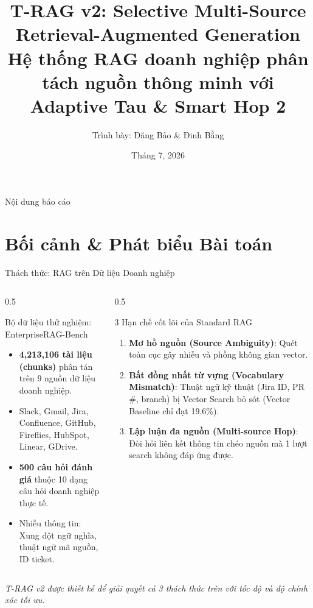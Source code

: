 \documentclass[aspectratio=169,10pt]{beamer}
\title[\textbf{T-RAG v2}]{\textbf{T-RAG v2: Selective Multi-Source Retrieval-Augmented Generation}\\
\large Hệ thống RAG doanh nghiệp phân tách nguồn thông minh với Adaptive Tau \& Smart Hop 2}
\author{Trình bày: Đăng Bảo \& Đinh Bằng}
\date{Tháng 7, 2026}
\institute{}
\begin{document}
\begin{frame}
\titlepage
\end{frame}

\begin{frame}{Nội dung báo cáo}
\tableofcontents
\end{frame}

\section{Bối cảnh \& Phát biểu Bài toán}

\begin{frame}{Thách thức: RAG trên Dữ liệu Doanh nghiệp}
\small
\begin{columns}
\begin{column}{0.5\textwidth}
\begin{block}{Bộ dữ liệu thử nghiệm: EnterpriseRAG-Bench}
\begin{itemize}
    \item \textbf{4,213,106 tài liệu (chunks)} phân tán trên 9 nguồn dữ liệu doanh nghiệp.
    \item Slack, Gmail, Jira, Confluence, GitHub, Fireflies, HubSpot, Linear, GDrive.
    \item \textbf{500 câu hỏi đánh giá} thuộc 10 dạng câu hỏi doanh nghiệp thực tế.
    \item Nhiễu thông tin: Xung đột ngữ nghĩa, thuật ngữ mã nguồn, ID ticket.
\end{itemize}
\end{block}
\end{column}
\begin{column}{0.5\textwidth}
\begin{alertblock}{3 Hạn chế cốt lõi của Standard RAG}
\begin{enumerate}
    \item \textbf{Mơ hồ nguồn (Source Ambiguity)}: Quét toàn cục gây nhiễu và phồng không gian vector.
    \item \textbf{Bất đồng nhất từ vựng (Vocabulary Mismatch)}: Thuật ngữ kỹ thuật (Jira ID, PR \#, branch) bị Vector Search bỏ sót (Vector Baseline chỉ đạt 19.6\%).
    \item \textbf{Lập luận đa nguồn (Multi-source Hop)}: Đòi hỏi liên kết thông tin chéo nguồn mà 1 lượt search không đáp ứng được.
\end{enumerate}
\end{alertblock}
\end{column}
\end{columns}

\vspace{0.3cm}
\begin{center}
\textit{T-RAG v2 được thiết kế để giải quyết cả 3 thách thức trên với tốc độ và độ chính xác tối ưu.}
\end{center}
\end{frame}
\end{document}
